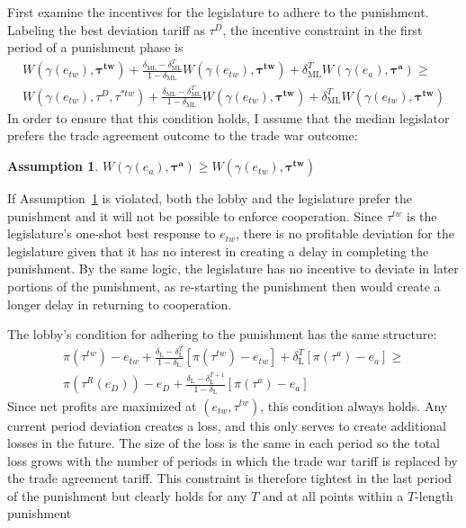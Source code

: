 \documentclass[authoryear, review]{elsarticle}
\newtheorem{assumption}{Assumption}
\newcommand{\bta}{\bm{\tau^a}}
\newcommand{\ga}{\gamma}
\newcommand{\btw}{\bm{\tau^{tw}}}
\newcommand{\de}{\delta}
\begin{document}
First examine the incentives for the legislature to adhere to the punishment. Labeling the best deviation tariff as $\tau^D$, the incentive constraint in the first period of a punishment phase is 
  \begin{multline}
		W(\ga(e_{tw}),\btw) + \frac{\de_\text{ML} - \de_\text{ML}^{T}}{1-\de_\text{ML}}W(\ga(e_{tw}),\btw) + \de_\text{ML}^{T} W(\ga(e_a),\bta) \geq \\ W(\ga(e_{tw}),\tau^D,\tau^{*tw}) + \frac{\de_\text{ML} - \de_\text{ML}^{T}}{1-\de_\text{ML}}W(\ga(e_{tw}),\btw) + \de_\text{ML}^{T} W(\ga(e_{tw}),\btw)
		\label{eq:legpun}
	\end{multline}
In order to ensure that this condition holds, I assume that the median legislator prefers the trade agreement outcome to the trade war outcome:
\begin{assumption}
  $W(\ga(e_a),\bta) \geq W(\ga(e_{tw}),\btw)$
	\label{as:leg}
\end{assumption}
If Assumption~\ref{as:leg} is violated, both the lobby and the legislature prefer the punishment and it will not be possible to enforce cooperation. Since $\tau^{tw}$ is the legislature's one-shot best response to $e_{tw}$, there is no profitable deviation for the legislature given that it has no interest in creating a delay in completing the punishment. By the same logic, the legislature has no incentive to deviate in later portions of the punishment, as re-starting the punishment then would create a longer delay in returning to cooperation.

The lobby's condition for adhering to the punishment has the same structure:
  \begin{multline}
	  \pi(\tau^{tw}) - e_{tw} + \frac{\de_\text{L} - \de_\text{L}^T}{1-\de_\text{L}} \left[\pi(\tau^{tw}) - e_{tw} \right] + \de_\text{L}^T \left[\pi(\tau^a) - e_a \right] \geq \\  \pi\left(\tau^R\left(e_D\right)\right) -e_D + \frac{\de_\text{L} - \de_\text{L}^{T+1}}{1-\de_\text{L}} \left[ \pi(\tau^a) - e_a \right]
		\label{eq:lobpun}
	\end{multline}
Since net profits are maximized at $\left(e_{tw},\tau^{tw}\right)$, this condition always holds. Any current period deviation creates a loss, and this only serves to create additional losses in the future. The size of the loss is the same in each period so the total loss grows with the number of periods in which the trade war tariff is replaced by the trade agreement tariff. This constraint is therefore tightest in the last period of the punishment but clearly holds for any $T$ and at all points within a $T$-length punishment
\end{document}
